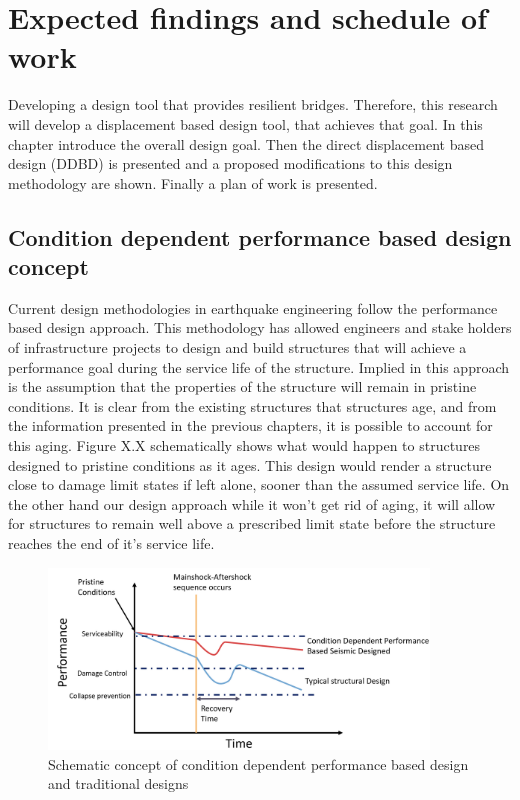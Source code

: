 \chapter{Expected findings and schedule of work}
Developing a design tool that provides resilient bridges. Therefore, this research will develop a displacement based design tool, that achieves that goal. In this chapter introduce the overall design goal. Then the direct displacement based design (DDBD) is presented and a proposed modifications to this design methodology are shown. Finally a plan of work is presented.

\section{Condition dependent performance based design concept}

Current design methodologies in earthquake engineering follow the performance based design approach. This methodology has allowed engineers and stake holders of infrastructure projects to design and build structures that will achieve a performance goal during the service life of the structure. Implied in this approach is the assumption that the properties of the structure will remain in pristine conditions. It is clear from the existing structures that structures age, and from the information presented in the previous chapters, it is possible to account for this aging. Figure X.X schematically shows what would happen to structures designed to pristine conditions as it ages. This design would render a structure close to damage limit states if left alone, sooner than the assumed service life. On the other hand our design approach while it won't get rid of aging, it will allow for structures to remain well above a prescribed limit state before the structure reaches the end of it's service life. 

\begin{figure}[htbp]
	\centering
	\includegraphics[width=0.90\textwidth]{VAC Prelim 2.0/Chapter-5/figs/CD_DDBD_Concept.png}
	\caption{Schematic concept of condition dependent performance based design and traditional designs}
	\label{fig:Concept_CD-DDBD}
\end{figure}

